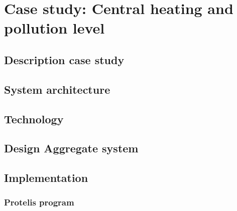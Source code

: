 \chapter{Case study: Central heating and pollution level}
\label{chap:case-staudyAC}

\section{Description case study}


\section{System architecture}


\section{Technology}
\section{Design Aggregate system}
\section{Implementation}
\subsection{Protelis program}